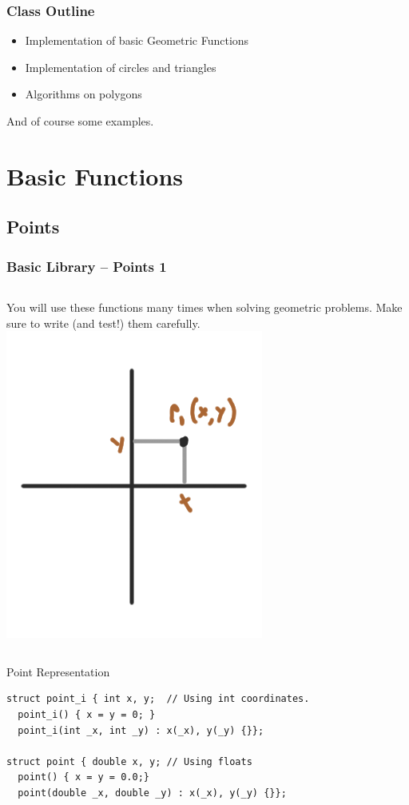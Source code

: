 \documentclass{beamer}
\begin{document}
\begin{frame}
  \frametitle{Class Outline}
  \begin{itemize}
  \item Implementation of basic Geometric Functions    
  \item Implementation of circles and triangles
  \item Algorithms on polygons
  \end{itemize}

  \bigskip

  And of course some examples.
\end{frame}

\section{Basic Functions}
\subsection{Points}
\begin{frame}[fragile]
  \frametitle{Basic Library -- Points 1}  

  {\smaller
    \begin{columns}
      You will use these functions many times
      when solving geometric problems. Make sure to write
      (and test!) them carefully.
      \includegraphics[width=.65\textwidth]{../img/geom2}
    \end{columns}

    \begin{exampleblock}{Point Representation}
\begin{verbatim}
struct point_i { int x, y;  // Using int coordinates.
  point_i() { x = y = 0; }
  point_i(int _x, int _y) : x(_x), y(_y) {}};

struct point { double x, y; // Using floats
  point() { x = y = 0.0;}
  point(double _x, double _y) : x(_x), y(_y) {}};
\end{verbatim}
    \end{exampleblock}
  }
\end{frame}
\end{document}
